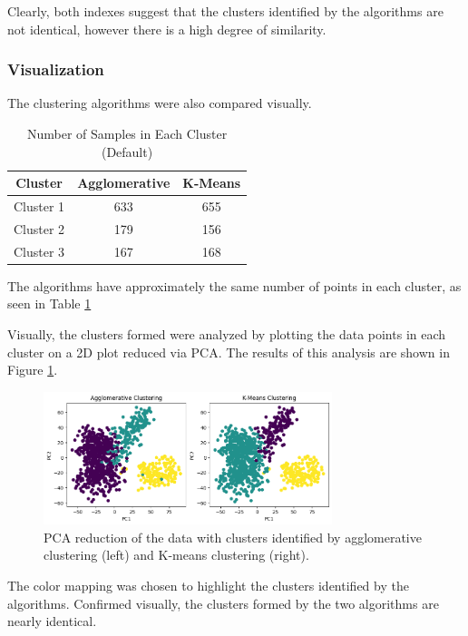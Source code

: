 \documentclass[11pt]{article}
\begin{document}
Clearly, both indexes suggest that the clusters identified by the algorithms are not identical, however there is a high degree of similarity.

\subsubsection*{Visualization}
The clustering algorithms were also compared visually.

\begin{table}[ht]
    \centering
    \begin{tabular}{|c|c|c|}
    \hline
    Cluster & Agglomerative & K-Means \\
    \hline
    Cluster 1 & 633 & 655 \\
    Cluster 2 & 179 & 156 \\
    Cluster 3 & 167 & 168 \\
    \hline
    \end{tabular}
    \caption{Number of Samples in Each Cluster (Default)}
    \label{tab:default_clusters_prop}
\end{table}

The algorithms have approximately the same number of points in each cluster, as seen in Table \ref{tab:default_clusters_prop}

Visually, the clusters formed were analyzed by plotting the data points in each cluster on a 2D plot reduced via PCA. The results of this analysis are shown in Figure \ref{fig:cluster_visual}.

\begin{figure}[H]
    \centering
    \includegraphics[width=0.75\textwidth]{Images/cluster visual.png}
    \caption{PCA reduction of the data with clusters identified by agglomerative clustering (left) and K-means clustering (right).}
    \label{fig:cluster_visual}
\end{figure}

\vspace{-0.5cm}

The color mapping was chosen to highlight the clusters identified by the algorithms. Confirmed visually, the clusters formed by the two algorithms are nearly identical.
\end{document}
